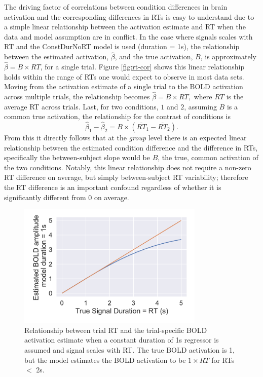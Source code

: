 \documentclass[titlepage,12pt] {article}
\begin{document}
The driving factor of correlations between condition differences in brain activation and the corresponding differences in RTs  is easy to understand due to a simple linear relationship between the activation estimate and RT when the data and model assumption are in conflict. In the case where signals scales with RT and the ConstDurNoRT model is used (duration = 1s), the relationship between the estimated activation, $\hat\beta$, and the true activation, $B$, is approximately $\hat\beta = B \times RT$, for a single trial.  Figure \ref{fig:rt-cor} shows this linear relationship holds within the range of RTs one would expect to observe in most data sets.  Moving from the activation estimate of a single trial to the BOLD activation across multiple trials, the relationship becomes $\hat\beta = B\times \overline{RT}, $ where $\overline{RT}$ is the average RT across trials.  Last, for two conditions, $1$ and $2$, assuming $B$ is a common true activation, the relationship for the contrast of conditions is $$\hat\beta_1 -\hat\beta_2 = B\times\left(\overline{RT}_1 - \overline{RT}_2\right).$$
From this it directly follows that at the \emph{group} level there is an expected linear relationship between the estimated condition difference and the difference in RTs, specifically the between-subject slope would be $B$, the true, common activation of the two conditions.  Notably, this linear relationship does not require a non-zero RT difference on average, but simply between-subject RT variability; therefore the RT difference is an important confound regardless of whether it is significantly different from 0 on average.

\begin{figure}
  \centering
   \includegraphics[width=3.5in]{Figures/bold_fcn_rt_1sdur_only.pdf}
   \caption{Relationship between trial RT and the trial-specific BOLD activation estimate when a constant duration of 1s regressor is assumed and signal scales with RT.  The true BOLD activation is 1, but the model estimates the BOLD activation to be $1\times RT$ for RTs $<$ 2s.}
  \label{fig:bold_rt}
\end{figure}
\end{document}
